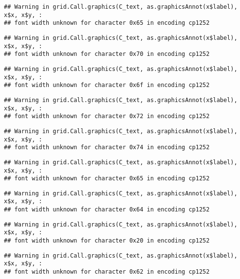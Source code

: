 \documentclass[
]{article}
\begin{document}
\begin{verbatim}
## Warning in grid.Call.graphics(C_text, as.graphicsAnnot(x$label), x$x, x$y, :
## font width unknown for character 0x65 in encoding cp1252
\end{verbatim}

\begin{verbatim}
## Warning in grid.Call.graphics(C_text, as.graphicsAnnot(x$label), x$x, x$y, :
## font width unknown for character 0x70 in encoding cp1252
\end{verbatim}

\begin{verbatim}
## Warning in grid.Call.graphics(C_text, as.graphicsAnnot(x$label), x$x, x$y, :
## font width unknown for character 0x6f in encoding cp1252
\end{verbatim}

\begin{verbatim}
## Warning in grid.Call.graphics(C_text, as.graphicsAnnot(x$label), x$x, x$y, :
## font width unknown for character 0x72 in encoding cp1252
\end{verbatim}

\begin{verbatim}
## Warning in grid.Call.graphics(C_text, as.graphicsAnnot(x$label), x$x, x$y, :
## font width unknown for character 0x74 in encoding cp1252
\end{verbatim}

\begin{verbatim}
## Warning in grid.Call.graphics(C_text, as.graphicsAnnot(x$label), x$x, x$y, :
## font width unknown for character 0x65 in encoding cp1252
\end{verbatim}

\begin{verbatim}
## Warning in grid.Call.graphics(C_text, as.graphicsAnnot(x$label), x$x, x$y, :
## font width unknown for character 0x64 in encoding cp1252
\end{verbatim}

\begin{verbatim}
## Warning in grid.Call.graphics(C_text, as.graphicsAnnot(x$label), x$x, x$y, :
## font width unknown for character 0x20 in encoding cp1252
\end{verbatim}

\begin{verbatim}
## Warning in grid.Call.graphics(C_text, as.graphicsAnnot(x$label), x$x, x$y, :
## font width unknown for character 0x62 in encoding cp1252
\end{verbatim}
\end{document}
